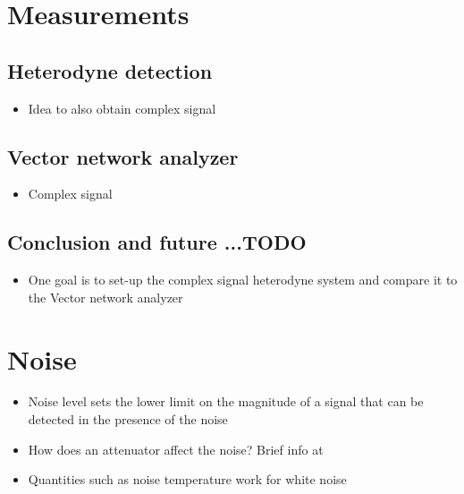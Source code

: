 \documentclass[12pt]{report}
\begin{document}
\chapter{Measurements}



\section{Heterodyne detection}
\begin{itemize}
    \item Idea to also obtain complex signal
\end{itemize}

\section{Vector network analyzer}
\begin{itemize}
    \item Complex signal
\end{itemize}

\section{Conclusion and future ...TODO}

\begin{itemize}
    \item One goal is to set-up the complex signal heterodyne system and compare it to the Vector network analyzer
\end{itemize}
















\chapter{Noise}




\begin{itemize}
    \item Noise level sets the lower limit on the magnitude of a signal that can be detected in the presence of the noise
    \item How does an attenuator affect the noise? Brief info at \cite[p.~4]{Iulian}
    \item Quantities such as noise temperature work for white noise
\end{itemize}
\end{document}
